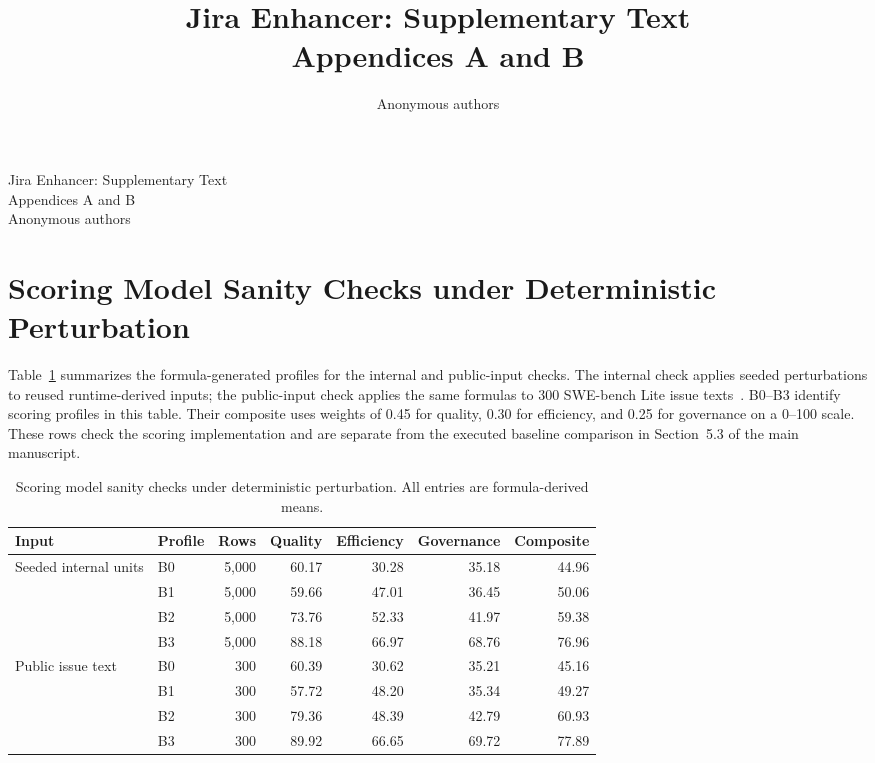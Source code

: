 \documentclass[10pt,a4paper]{article}
\title{Jira Enhancer: Supplementary Text\\Appendices A and B}
\author{Anonymous authors}
\date{}
\begin{document}
\begin{center}
\Large Jira Enhancer: Supplementary Text\\Appendices A and B\\[0.4em]
\normalsize Anonymous authors
\end{center}
\appendix
\setcounter{table}{5}
\renewcommand{\thetable}{\thesection.\arabic{table}}
\section{Scoring Model Sanity Checks under Deterministic Perturbation}\label{sec:stress-testing}
Table~\ref{tab:scoring-sanity-checks} summarizes the formula-generated profiles for the internal and public-input checks. The internal check applies seeded perturbations to reused runtime-derived inputs; the public-input check applies the same formulas to 300 SWE-bench Lite issue texts~\citep{R26}. B0--B3 identify scoring profiles in this table. Their composite uses weights of 0.45 for quality, 0.30 for efficiency, and 0.25 for governance on a 0--100 scale. These rows check the scoring implementation and are separate from the executed baseline comparison in Section~5.3 of the main manuscript.

\begin{table}[htbp]
\centering
\setlength{\tabcolsep}{3pt}
\small
\caption{Scoring model sanity checks under deterministic perturbation. All entries are formula-derived means.}
\label{tab:scoring-sanity-checks}
\begin{tabular}{@{}llrrrrr@{}}
\toprule
Input & Profile & Rows & Quality & Efficiency & Governance & Composite \\
\midrule
Seeded internal units & B0 & 5,000 & 60.17 & 30.28 & 35.18 & 44.96 \\
 & B1 & 5,000 & 59.66 & 47.01 & 36.45 & 50.06 \\
 & B2 & 5,000 & 73.76 & 52.33 & 41.97 & 59.38 \\
 & B3 & 5,000 & 88.18 & 66.97 & 68.76 & 76.96 \\
\midrule
Public issue text & B0 & 300 & 60.39 & 30.62 & 35.21 & 45.16 \\
 & B1 & 300 & 57.72 & 48.20 & 35.34 & 49.27 \\
 & B2 & 300 & 79.36 & 48.39 & 42.79 & 60.93 \\
 & B3 & 300 & 89.92 & 66.65 & 69.72 & 77.89 \\
\bottomrule
\end{tabular}
\end{table}
\end{document}
